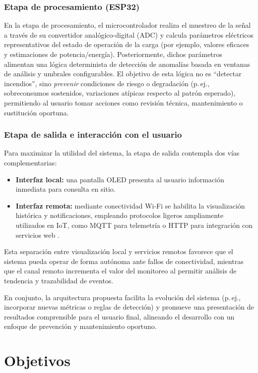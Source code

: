 ﻿\documentclass[12pt,openright,oneside]{report}
\theoremstyle{mytheoremstyle}
\theoremstyle{mytheoremstyle}
\theoremstyle{myproblemstyle}
\begin{document}
\subsubsection{Etapa de procesamiento (ESP32)}
\label{subsubsec:procesamiento}
En la etapa de procesamiento, el microcontrolador realiza el muestreo de la señal a través de su convertidor analógico-digital (ADC) y calcula parámetros eléctricos representativos del estado de operación de la carga (por ejemplo, valores eficaces y estimaciones de potencia/energía). Posteriormente, dichos parámetros alimentan una lógica determinista de detección de anomalías basada en ventanas de análisis y umbrales configurables. El objetivo de esta lógica no es ``detectar incendios'', sino \textit{prevenir} condiciones de riesgo o degradación (p.\,ej., sobreconsumos sostenidos, variaciones atípicas respecto al patrón esperado), permitiendo al usuario tomar acciones como revisión técnica, mantenimiento o sustitución oportuna.

\subsubsection{Etapa de salida e interacción con el usuario}
\label{subsubsec:salida}
Para maximizar la utilidad del sistema, la etapa de salida contempla dos vías complementarias:
\begin{itemize}
    \item \textbf{Interfaz local:} una pantalla OLED presenta al usuario información inmediata para consulta en sitio.
    \item \textbf{Interfaz remota:} mediante conectividad Wi-Fi se habilita la visualización histórica y notificaciones, empleando protocolos ligeros ampliamente utilizados en IoT, como MQTT para telemetría o HTTP para integración con servicios web \cite{mqtt-oasis,fielding2000rest}.
\end{itemize}

Esta separación entre visualización local y servicios remotos favorece que el sistema pueda operar de forma autónoma ante fallos de conectividad, mientras que el canal remoto incrementa el valor del monitoreo al permitir análisis de tendencia y trazabilidad de eventos.

En conjunto, la arquitectura propuesta facilita la evolución del sistema (p.\,ej., incorporar nuevas métricas o reglas de detección) y promueve una presentación de resultados comprensible para el usuario final, alineando el desarrollo con un enfoque de prevención y mantenimiento oportuno.
\section{Objetivos}
\label{subsec:objetivos}
\end{document}
